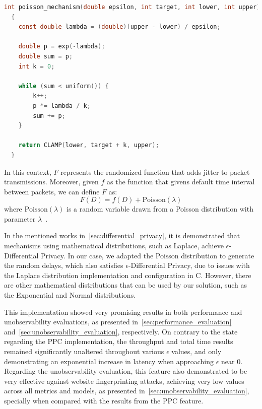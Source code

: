 \begin{lstlisting}[language=C, caption={Poisson Distribution Pseudo-Random Number Generator implementation.}, label={lst:poisson_distribution}]
  int poisson_mechanism(double epsilon, int target, int lower, int upper)
  {
    const double lambda = (double)(upper - lower) / epsilon;

    double p = exp(-lambda);
    double sum = p;
    int k = 0;

    while (sum < uniform()) {
        k++;
        p *= lambda / k;
        sum += p;
    }

    return CLAMP(lower, target + k, upper);
  }
\end{lstlisting}

In this context, $F$ represents the randomized function that adds jitter to packet transmissions. Moreover, given $f$ as the function that givens default time interval between packets, we can define $F$ as:
\[F(D) = f(D) + \text{Poisson}(\lambda)\]
where $\text{Poisson}(\lambda)$ is a random variable drawn from a Poisson distribution with parameter $\lambda$~\cite{DP_Book, AlgFoundationsDP}. 


In the mentioned works in~\autoref{sec:differential_privacy}, it is demonstrated that mechanisms using mathematical distributions, such as Laplace, achieve $\epsilon$-Differential Privacy. In our case, we adapted the Poisson distribution to generate the random delays, which also satisfies $\epsilon$-Differential Privacy, due to issues with the Laplace distribution implementation and configuration in C. However, there are other mathematical distributions that can be used by our solution, such as the Exponential and Normal distributions.

This implementation showed very promising results in both performance and unobservability evaluations, as presented in~\autoref{sec:performance_evaluation} and~\autoref{sec:unobservability_evaluation}, respectively. On contrary to the state regarding the PPC implementation, the throughput and total time results remained significantly unaltered throughout various $\epsilon$ values, and only demonstrating an exponential increase in latency when approaching $\epsilon$ near 0. Regarding the unobservability evaluation, this feature also demonstrated to be very effective against website fingerprinting attacks, achieving very low values across all metrics and models, as presented in~\autoref{sec:unobservability_evaluation}, specially when compared with the results from the PPC feature.

